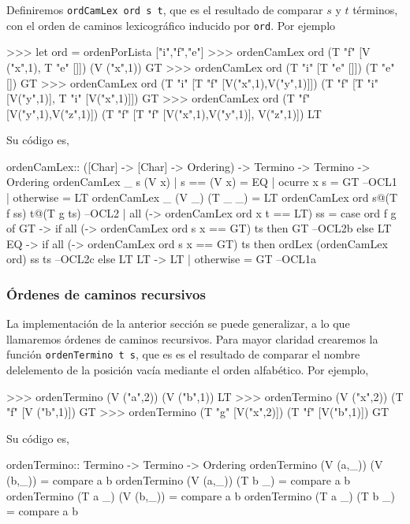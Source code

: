 Definiremos \texttt{ordCamLex ord s t}, que es el resultado de
comparar $s$ y $t$ términos, con el orden de caminos lexicográfico
inducido por \texttt{ord}. Por ejemplo

\begin{sesion}
>>> let ord = ordenPorLista ["i","f","e"]
>>> ordenCamLex ord (T "f" [V ("x",1), T "e" []]) (V ("x",1))
GT
>>> ordenCamLex ord (T "i" [T "e" []]) (T "e" [])
GT
>>> ordenCamLex ord (T "i" [T "f" [V("x",1),V("y",1)]])
                      (T "f" [T "i" [V("y",1)], T "i" [V("x",1)]])
GT
>>> ordenCamLex ord (T "f" [V("y",1),V("z",1)])
                      (T "f" [T "f" [V("x",1),V("y",1)], V("z",1)])
LT
\end{sesion}

Su código es,

\begin{codigo}
 ordenCamLex:: ([Char] -> [Char] -> Ordering)
                -> Termino -> Termino -> Ordering
ordenCamLex _ s (V x)
  | s == (V x) = EQ
  | ocurre x s = GT --OCL1
  | otherwise = LT
ordenCamLex _ (V _) (T _ _) = LT
ordenCamLex ord s@(T f ss) t@(T g ts) --OCL2
  | all (\x -> ordenCamLex ord x t == LT) ss
    = case ord f g of
      GT -> if all (\x -> ordenCamLex ord s x == GT) ts
            then GT --OCL2b
            else LT
      EQ -> if all (\x -> ordenCamLex ord s x == GT) ts
            then ordLex (ordenCamLex ord) ss ts --OCL2c
            else LT
      LT -> LT  
  | otherwise = GT --OCL1a
\end{codigo}

\subsubsection{Órdenes de caminos recursivos}

La implementación de la anterior sección se puede generalizar, a lo
que llamaremos órdenes de caminos recursivos. Para mayor claridad
crearemos la función \texttt{ordenTermino t s}, que es es el
resultado de comparar el nombre delelemento de la posición vacía
mediante el orden alfabético. Por ejemplo,

\begin{sesion}
>>> ordenTermino (V ("a",2)) (V ("b",1))
LT
>>> ordenTermino (V ("x",2)) (T "f" [V ("b",1)])
GT
>>> ordenTermino (T "g" [V("x",2)]) (T "f" [V("b",1)])
GT
\end{sesion}

Su código es,

\begin{codigo}
ordenTermino::  Termino -> Termino -> Ordering
ordenTermino (V (a,_)) (V (b,_)) = compare a b
ordenTermino (V (a,_)) (T b _) = compare a b
ordenTermino (T a _) (V (b,_)) = compare a b
ordenTermino (T a _) (T b _) = compare a b
\end{codigo}

